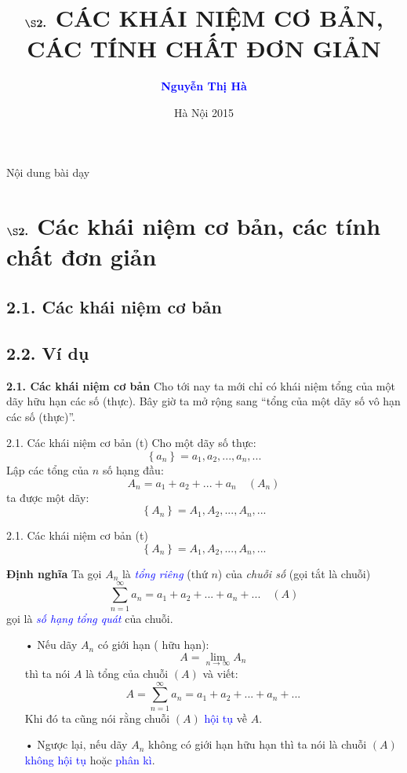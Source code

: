 \documentclass[compress,  hyperref={unicode, bookmarks=true, pdfpagemode=FullScreen}]{beamer}
\title[Bài giảng]{\bf \Large{{   $\boldsymbol{\S 2. }$ CÁC KHÁI NIỆM CƠ BẢN, CÁC TÍNH CHẤT ĐƠN GIẢN  }}}
\author[N. T. Hà]{\bf \large \textcolor{blue}{Nguyễn Thị Hà}}
\institute[Đại học Thủ đô Hà Nội]{}
\date{Hà Nội 2015}
\newcommand{\duong}[1]{\textcolor{blue}{#1}}
\begin{document}
\frame{%
\transblindshorizontal
\titlepage}
\begin{frame}{Nội dung bài dạy}
  \tableofcontents
\end{frame}
\fontsize{15pt}{19pt}  \selectfont

\section{\bf $\boldsymbol{\S 2. }$ Các khái niệm cơ bản, các tính chất đơn giản}
\subsection{\bf 2.1. Các khái niệm cơ bản}
\subsection{\bf 2.2. Ví dụ}
\begin{frame} {\bf 2.1. Các khái niệm cơ bản}
\pause 
Cho tới nay ta mới chỉ có khái niệm tổng của một dãy hữu hạn các số  (thực). \pause Bây giờ ta mở rộng sang ``tổng của một dãy số vô hạn các số (thực)''.
\end{frame}

\begin{frame}{2.1. Các khái niệm cơ bản (t)}
Cho một dãy số thực:
\[\left\{ {{a_n}} \right\} = {a_1},{a_2},...,{a_n},...\]
\pause
Lập các tổng của $n$ số hạng đầu:
\[{A_n} = {a_1}+{a_2}+...+{a_n}\quad(A_n)\]
\pause
ta được một dãy:
\[\left\{ {{A_n}} \right\} = {A_1},{A_2},...,{A_n},...\]
\end{frame}

\begin{frame}{2.1. Các khái niệm cơ bản (t)}
\[\left\{ {{A_n}} \right\} = {A_1},{A_2},...,{A_n},...\]
\begin{block}{\bf Định nghĩa}
\pause
Ta gọi $A_n$ là \duong{\textit{tổng riêng}} (thứ $n$) của \textit{chuỗi số} (gọi tắt là chuỗi)
\pause
\[\sum\limits_{n = 1}^\infty  {{a_n}}  = {a_1}+{a_2}+...+{a_n}+ ... \quad (A)\]
gọi là \duong{\textit{số hạng tổng quát}} của chuỗi.
\end{block} 
\end{frame}

\begin{frame}
\begin{block}{}
\begin{itemize}
\item[•]
Nếu dãy ${A_n}$ có giới hạn ( hữu hạn):
\[A = \mathop {\lim }\limits_{n \to \infty } {A_n}\]
\pause
thì ta nói $A$ là tổng của chuỗi $(A)$ và viết:
\[{A = }\sum\limits_{n = 1}^\infty  {{a_n}}  = {a_1}+{a_2}+...+{a_n}+ ...\]
\pause
Khi đó ta cũng nói rằng chuỗi $(A)$ \duong{hội tụ} về $A$.\\
\pause
\item[•]
Ngược lại, nếu dãy ${A_n}$ không có giới hạn hữu hạn thì ta nói là chuỗi $(A)$ \duong{không hội tụ} hoặc \duong{phân kì}.
\end{itemize}
\end{block}
\end{frame}
\end{document}
